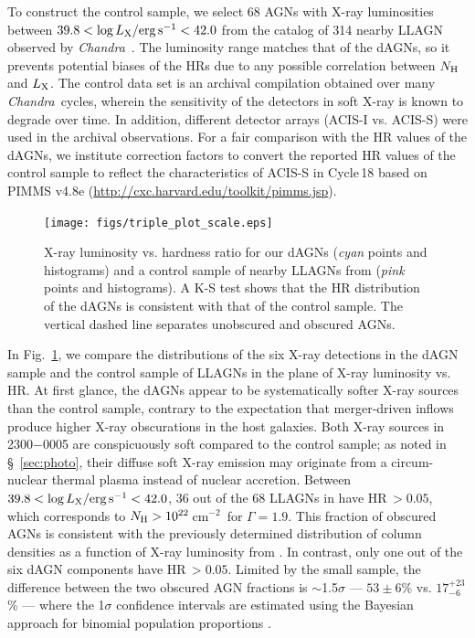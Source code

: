\documentclass[iop,revtex4,twocolumn,apj,numberedappendix,appendixfloats]{emulateapj}
\newcommand{\cmsq}{cm$^{-2}$}
\newcommand{\chandra}{{\it Chandra}}
\begin{document}
To construct the control sample, we select 68 AGNs with X-ray luminosities between $39.8 < \log L_{\rm X}/{\rm erg\,s^{-1}} < 42.0$ from the catalog of 314 nearby LLAGN observed by \chandra\ \citep{She17}. The luminosity range matches that of the dAGNs, so it prevents potential biases of the HRs due to any possible correlation between $N_{\rm H}$ and $L_{\rm X}$. The control data set is an archival compilation obtained over many \chandra\ cycles, wherein the sensitivity of the detectors in soft X-ray is known to degrade over time. In addition, different detector arrays (ACIS-I vs. ACIS-S) were used in the archival observations. For a fair comparison with the HR values of the dAGNs, we institute correction factors to convert the reported HR values of the control sample to reflect the characteristics of ACIS-S in Cycle\,18 based on PIMMS v4.8e (\url{http://cxc.harvard.edu/toolkit/pimms.jsp}). 

\begin{figure}
\texttt{[image: figs/triple\_plot\_scale.eps]}
\caption{X-ray luminosity vs. hardness ratio for our dAGNs ({\it cyan} points and histograms) and a control sample of nearby LLAGNs from \citet{She17} ({\it pink} points and histograms). A K-S test shows that the HR distribution of the dAGNs is consistent with that of the control sample. The vertical dashed line separates unobscured and obscured AGNs.}
\label{fig:HR_compare}
\end{figure}

In Fig.~\ref{fig:HR_compare}, we compare the distributions of the six X-ray detections in the dAGN sample and the control sample of LLAGNs in the plane of X-ray luminosity vs. HR. At first glance, the dAGNs appear to be systematically softer X-ray sources than the control sample, contrary to the expectation that merger-driven inflows produce higher X-ray obscurations in the host galaxies. Both X-ray sources in 2300$-$0005 are conspicuously soft compared to the control sample; as noted in \S~\ref{sec:photo}, their diffuse soft X-ray emission may originate from a circum-nuclear thermal plasma instead of nuclear accretion. Between $39.8 < \log L_{\rm X}/{\rm erg\,s^{-1}} < 42.0$, 36 out of the 68 LLAGNs in \citet{She17} have HR\,$> 0.05$, which corresponds to $N_{\rm H} > 10^{22}$\,\cmsq\ for $\Gamma = 1.9$. This fraction of obscured AGNs is consistent with the previously determined distribution of column densities as a function of X-ray luminosity from \citet{Ueda03}. In contrast, only one out of the six dAGN components have HR\,$> 0.05$. Limited by the small sample, the difference between the two obscured AGN fractions is $\sim$1.5$\sigma$ --- $53\pm6$\% vs. $17^{+23}_{-6}$\% --- where the 1$\sigma$ confidence intervals are estimated using the Bayesian approach for binomial population proportions \citep{Cameron11}. 
\end{document}
